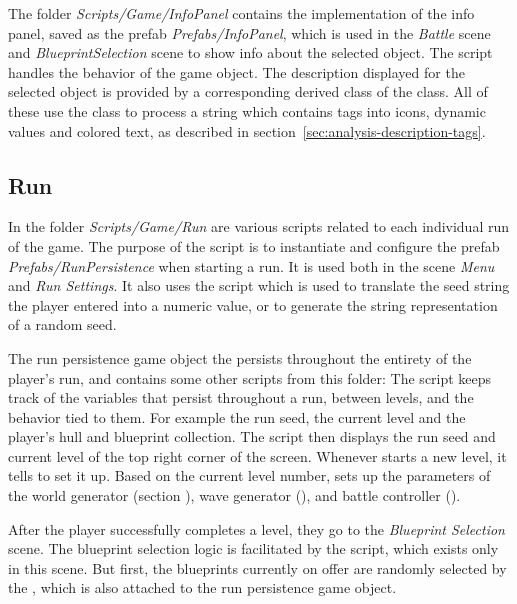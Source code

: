 The folder \emph{Scripts/Game/InfoPanel} contains the implementation of the info panel, saved as the prefab \emph{Prefabs/InfoPanel}, which is used in the \emph{Battle} scene and \emph{BlueprintSelection} scene to show info about the selected object.
The script  handles the behavior of the game object.
The description displayed for the selected object is provided by a corresponding derived class of the  class.
All of these use the  class to process a string which contains tags into icons, dynamic values and colored text, as described in section~\ref{sec:analysis-description-tags}.

\subsection{Run}

In the folder \emph{Scripts/Game/Run} are various scripts related to each individual run of the game.
The purpose of the script  is to instantiate and configure the prefab \emph{Prefabs/RunPersistence} when starting a run.
It is used both in the scene \emph{Menu} and \emph{Run Settings}.
It also uses the script  which is used to translate the seed string the player entered into a numeric value, or to generate the string representation of a random seed.

The run persistence game object the persists throughout the entirety of the player's run, and contains some other scripts from this folder:
The script  keeps track of the variables that persist throughout a run, between levels, and the behavior tied to them.
For example the run seed, the current level and the player's hull and blueprint collection.
The script  then displays the run seed and current level of the top right corner of the screen.
Whenever  starts a new level, it tells  to set it up.
Based on the current level number,  sets up the parameters of the world generator (section ), wave generator (), and battle controller ().

After the player successfully completes a level, they go to the \emph{Blueprint Selection} scene.
The blueprint selection logic is facilitated by the  script, which exists only in this scene.
But first, the blueprints currently on offer are randomly selected by the , which is also attached to the run persistence game object.

